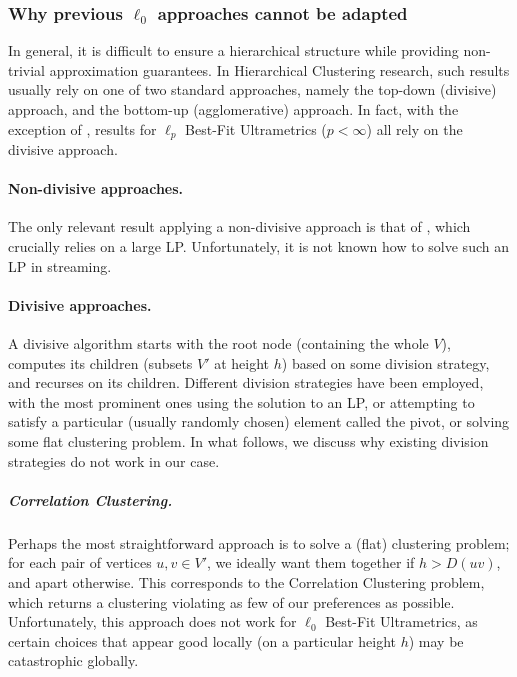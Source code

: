 \documentclass{article}
\begin{document}
\subsubsection{\texorpdfstring{Why previous $\ell_0$ approaches cannot be adapted}{Why previous l-0 approaches cannot be adapted}} \label{sec:othersDontWork}
In general, it is difficult to ensure a hierarchical structure while providing non-trivial approximation guarantees.
In Hierarchical Clustering research, such results usually rely on one of two standard approaches, namely the top-down (divisive) approach, and the bottom-up (agglomerative) approach.
In fact, with the exception of \cite{debarati}, results for $\ell_p$ Best-Fit Ultrametrics ($p<\infty$) \cite{mcgregor, charikar, debarati, cohen2022fitting, CharikarG24} all rely on the divisive approach.

\vspace{-3mm}

\paragraph{Non-divisive approaches.} The only relevant result applying a non-divisive approach is that of \cite{debarati}, which crucially relies on a large LP.
Unfortunately, it is not known how to solve such an LP in streaming.

\vspace{-3mm}

\paragraph{Divisive approaches.} A divisive algorithm starts with the root node (containing the whole $V$), computes its children (subsets $V'$ at height $h$) based on some division strategy, and recurses on its children. Different division strategies have been employed, with the most prominent ones using the solution to an LP, or attempting to satisfy a particular (usually randomly chosen) element called the pivot, or solving some flat clustering problem. In what follows, we discuss why existing division strategies do not work in our case.

\subparagraph{Correlation Clustering.} Perhaps the most straightforward approach is to solve a (flat) clustering problem; for each pair of vertices $u,v\in V'$, we ideally want them together if $h>D(uv)$, and apart otherwise.
This corresponds to the Correlation Clustering problem, which returns a clustering violating as few of our preferences as possible.
Unfortunately, this approach does not work for $\ell_0$ Best-Fit Ultrametrics, as certain choices that appear good locally (on a particular height $h$) may be catastrophic globally.
\end{document}

